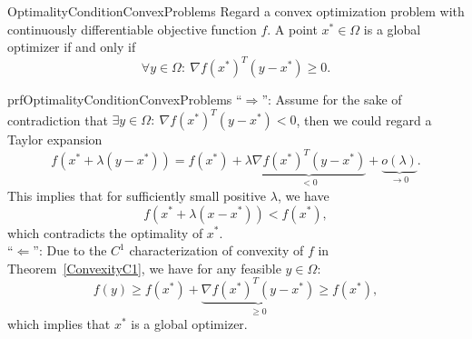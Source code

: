\begin{theo}{OptimalityConditionConvexProblems}
    Regard a convex optimization problem with continuously differentiable objective function $f$. A point $x^* \in \Omega$ is a global optimizer if and only if 
    \begin{equation*}
        \forall y \in \Omega: \ \nabla {f(x^*)}^T(y - x^*) \geq 0.
    \end{equation*} 
    \vspace*{-0.5cm}
\end{theo}


\begin{prf}{prfOptimalityConditionConvexProblems}
    ``$\Rightarrow$'': Assume for the sake of contradiction that $\exists y \in \Omega: \ \nabla {f(x^*)}^T(y - x^*) < 0$, then we could regard a Taylor expansion
    \begin{equation*}
        f(x^* + \lambda(y - x^*)) = f(x^*) + \lambda \underbrace{\nabla {f(x^*)}^T(y - x^*)}_{<0} + \underbrace{o(\lambda)}_{\rightarrow 0}.
    \end{equation*}
   This implies that for sufficiently small positive $\lambda$, we have 
   \begin{equation*}
        f(x^* + \lambda(x - x^*)) < f(x^*),
   \end{equation*}
   which contradicts the optimality of $x^*$. \\

    ``$\Leftarrow$'': 
   Due to the $C^1$ characterization of convexity of $f$ in Theorem~\ref{ConvexityC1}, we have for any feasible $y \in \Omega$: 
   \begin{equation*}
       f(y) \geq f(x^*) + \underbrace{\nabla {f(x^*)}^T(y - x^*)}_{\geq 0} \geq f(x^*),
   \end{equation*}
   which implies that $x^*$ is a global optimizer.
\end{prf}  


